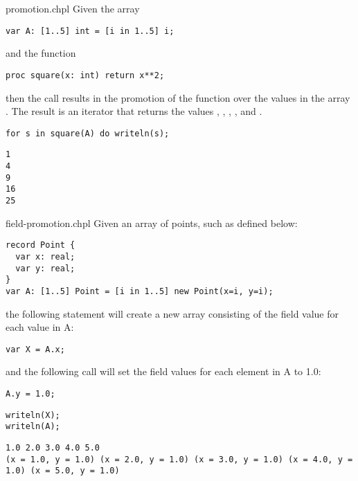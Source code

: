 \begin{chapelexample}{promotion.chpl}
Given the array
\begin{chapel}
\begin{verbatim}
var A: [1..5] int = [i in 1..5] i;
\end{verbatim}
\end{chapel}
and the function
\begin{chapel}
\begin{verbatim}
proc square(x: int) return x**2;
\end{verbatim}
\end{chapel}
then the call  results in the promotion of
the  function over the values in the array .  The
result is an iterator that returns the
values , , , , and .
\begin{chapelnoprint}
\begin{verbatim}
for s in square(A) do writeln(s);
\end{verbatim}
\end{chapelnoprint}
\begin{chapeloutput}
\begin{verbatim}
1
4
9
16
25
\end{verbatim}
\end{chapeloutput}
\end{chapelexample}

\begin{chapelexample}{field-promotion.chpl}
Given an array of points, such as  defined below:
\begin{chapel}
\begin{verbatim}
record Point {
  var x: real;
  var y: real;
}
var A: [1..5] Point = [i in 1..5] new Point(x=i, y=i);
\end{verbatim}
\end{chapel}
the following statement will create a new array consisting of
the  field value for each value in A:
\begin{chapel}
\begin{verbatim}
var X = A.x;
\end{verbatim}
\end{chapel}
and the following call will set the  field values for each
element in A to 1.0:
\begin{chapel}
\begin{verbatim}
A.y = 1.0;
\end{verbatim}
\end{chapel}

\begin{chapelnoprint}
\begin{verbatim}
writeln(X);
writeln(A);
\end{verbatim}
\end{chapelnoprint}
\begin{chapeloutput}
\begin{verbatim}
1.0 2.0 3.0 4.0 5.0
(x = 1.0, y = 1.0) (x = 2.0, y = 1.0) (x = 3.0, y = 1.0) (x = 4.0, y = 1.0) (x = 5.0, y = 1.0)
\end{verbatim}
\end{chapeloutput}
\end{chapelexample}


